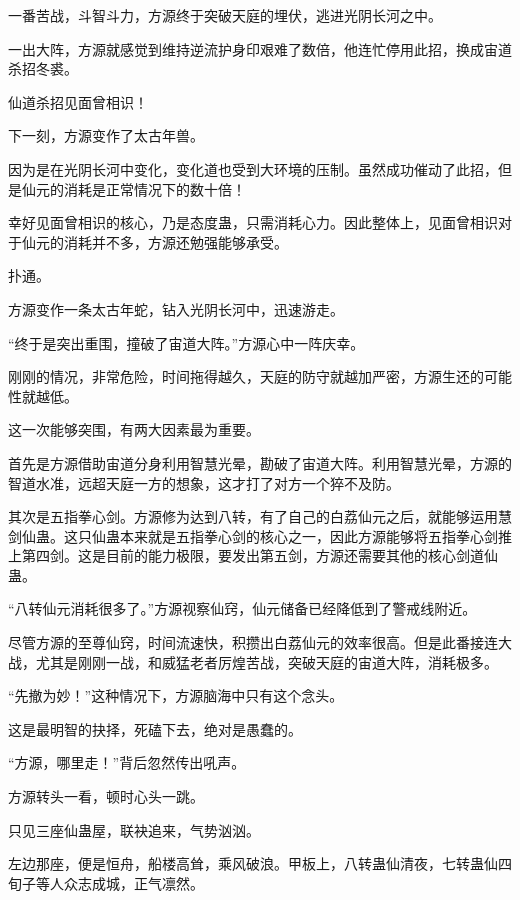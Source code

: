 
\begin{this_body}

一番苦战，斗智斗力，方源终于突破天庭的埋伏，逃进光阴长河之中。

一出大阵，方源就感觉到维持逆流护身印艰难了数倍，他连忙停用此招，换成宙道杀招冬裘。

仙道杀招见面曾相识！

下一刻，方源变作了太古年兽。

因为是在光阴长河中变化，变化道也受到大环境的压制。虽然成功催动了此招，但是仙元的消耗是正常情况下的数十倍！

幸好见面曾相识的核心，乃是态度蛊，只需消耗心力。因此整体上，见面曾相识对于仙元的消耗并不多，方源还勉强能够承受。

扑通。

方源变作一条太古年蛇，钻入光阴长河中，迅速游走。

“终于是突出重围，撞破了宙道大阵。”方源心中一阵庆幸。

刚刚的情况，非常危险，时间拖得越久，天庭的防守就越加严密，方源生还的可能性就越低。

这一次能够突围，有两大因素最为重要。

首先是方源借助宙道分身利用智慧光晕，勘破了宙道大阵。利用智慧光晕，方源的智道水准，远超天庭一方的想象，这才打了对方一个猝不及防。

其次是五指拳心剑。方源修为达到八转，有了自己的白荔仙元之后，就能够运用慧剑仙蛊。这只仙蛊本来就是五指拳心剑的核心之一，因此方源能够将五指拳心剑推上第四剑。这是目前的能力极限，要发出第五剑，方源还需要其他的核心剑道仙蛊。

“八转仙元消耗很多了。”方源视察仙窍，仙元储备已经降低到了警戒线附近。

尽管方源的至尊仙窍，时间流速快，积攒出白荔仙元的效率很高。但是此番接连大战，尤其是刚刚一战，和威猛老者厉煌苦战，突破天庭的宙道大阵，消耗极多。

“先撤为妙！”这种情况下，方源脑海中只有这个念头。

这是最明智的抉择，死磕下去，绝对是愚蠢的。

“方源，哪里走！”背后忽然传出吼声。

方源转头一看，顿时心头一跳。

只见三座仙蛊屋，联袂追来，气势汹汹。

左边那座，便是恒舟，船楼高耸，乘风破浪。甲板上，八转蛊仙清夜，七转蛊仙四旬子等人众志成城，正气凛然。


\end{this_body}
